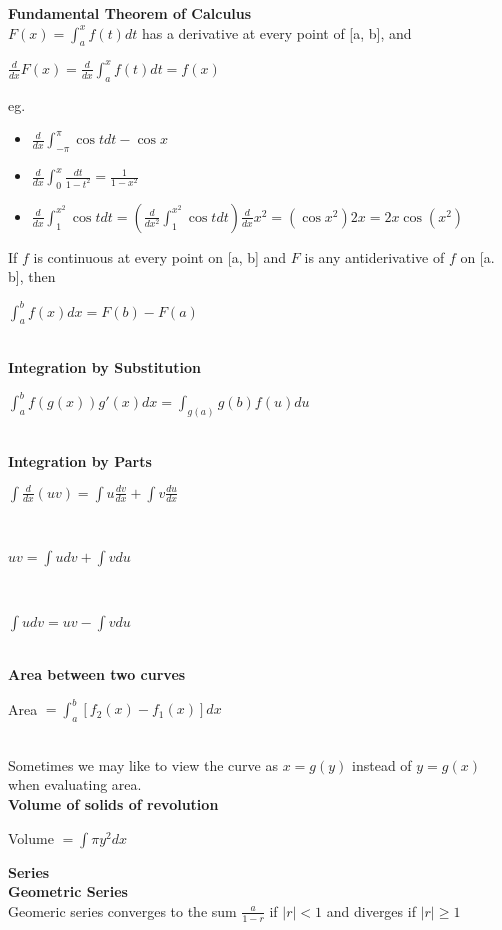 \documentclass[10pt, a4paper]{article}
\begin{document}
\begin{multicols*}{3}
	\textbf{Fundamental Theorem of Calculus}\\
	$F(x) = \int_{a}^{x} f(t)dt$ has a derivative at every point of [a, b], and \\
	\centerline{$\frac{d}{dx}F(x) = \frac{d}{dx} \int_{a}^{x} f(t) dt = f(x)$}
	eg. \begin{itemize}
		\setlength\itemsep{0em}
		\item $\frac{d}{dx} \int_{-\pi}^{\pi} \cos t dt - \cos x$
		\item $ \frac{d}{dx} \int_{0}^{x} \frac{dt}{1 - t^2} = \frac{1}{1 -x^2}$
		\item $\frac{d}{dx} \int_{1}^{x^2} \cos t dt = \left( \frac{d}{dx^2} \int_{1}^{x^2} \cos t dt \right) \frac{d}{dx}x^2 = (\cos x^2)2x = 2x\cos (x^2)$
	\end{itemize}
	If $f$ is continuous at every point on [a, b] and $F$ is any antiderivative of $f$ on [a. b], then\\
	\centerline{$\int_{a}^{b} f(x)dx = F(b) - F(a)$}\\
	
	\textbf{Integration by Substitution}\\
	\centerline{$ \int_{a}^{b} f(g(x))g'(x) dx = \int_{g(a)}{g(b)} f(u) du$}\\
	
	\textbf{Integration by Parts}\\
	\centerline{$\int \frac{d}{dx} (uv) = \int u \frac{dv}{dx} + \int v \frac{du}{dx}$}\\
	\centerline{$uv = \int udv + \int vdu$}\\
	\centerline{$\int udv = uv - \int vdu$}\\
		
	\textbf{Area between two curves}\\ 
		\centerline{Area $= \int_{a}^{b} [f_2(x) - f_1(x)] dx$ }\\
		Sometimes we may like to view the curve as $x = g(y)$ instead of $y = g(x)$ when evaluating area.\\
		
	\textbf{Volume of solids of revolution}\\
	\centerline{Volume $ = \int \pi y^2 dx$}		
	
	{\normalsize\textbf{Series}}\\
	
	\textbf{Geometric Series}\\
	Geomeric series converges to the sum $\frac{a}{1-r}$ if $\lvert r \rvert < 1$ and diverges if $\lvert r \rvert \geq 1$\\
	

\end{multicols*}
\end{document}
